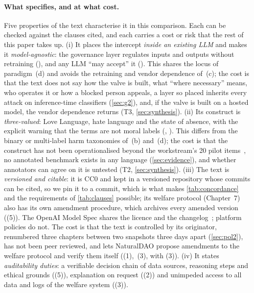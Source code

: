 \paragraph{What \pol{} specifies, and at what cost.}
Five properties of the \pol{} text characterise it in this comparison.
Each can be checked against the clauses cited, and each carries a cost or risk that the rest of this paper takes up.
(i) It places the intercept \emph{inside an existing LLM} and makes it \emph{model-agnostic}: the governance layer regulates inputs and outputs without retraining (), and any LLM ``may accept'' it ().
This shares the locus of paradigm~(d) and avoids the retraining and vendor dependence of~(c); the cost is that the text does not say how the valve is built, what ``where necessary'' means, who operates it or how a blocked person appeals, a layer so placed inherits every attack on inference-time classifiers (\cref{sec:g2}), and, if the valve is built on a hosted model, the vendor dependence returns (T3, \cref{sec:synthesis}).
(ii) Its construct is \emph{three-valued}: Love Language, hate language and the state of absence, with the explicit warning that the terms are not moral labels (, ).
This differs from the binary or multi-label harm taxonomies of~(b) and~(d); the cost is that the construct has not been operationalised beyond the workstream's 20 pilot items~\cite{polgov}, no annotated benchmark exists in any language (\cref{sec:evidence}), and whether annotators can agree on it is untested (T2, \cref{sec:synthesis}).
(iii) The text is \emph{versioned and citable}: it is CC0 and kept in a versioned repository whose commits can be cited, so we pin it to a commit, which is what makes \cref{tab:concordance} and the requirements of \cref{tab:clauses} possible; its welfare protocol (Chapter~7) also has its own amendment procedure, which archives every amended version ((5)).
The OpenAI Model Spec shares the licence and the changelog~\cite{openai2025modelspec}; platform policies do not.
The cost is that the text is controlled by its originator, renumbered three chapters between two snapshots three days apart (\cref{sec:pol2}), has not been peer reviewed, and lets NaturalDAO propose amendments to the welfare protocol and verify them itself ((1),~(3), with (3)).
(iv) It states \emph{auditability duties}: a verifiable decision chain of data sources, reasoning steps and ethical grounds ((5)), explanation on request ((2)) and unimpeded access to all data and logs of the welfare system ((3)).
